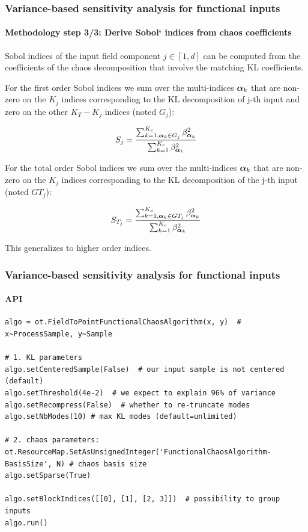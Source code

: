 \documentclass[aspectratio=169]{beamer}
\begin{document}
\begin{frame}
\frametitle{Variance-based sensitivity analysis for functional inputs}

\framesubtitle{Methodology step 3/3: Derive Sobol` indices from chaos coefficients}

Sobol indices of the input field component $j \in [1,d]$ can be computed
from the coefficients of the chaos decomposition that involve the
matching KL coefficients.

For the first order Sobol indices we sum over the multi-indices ${\mathbf{\boldsymbol{{\alpha}}}}_k$
that are non-zero on the $K_j$ indices corresponding to the KL
decomposition of j-th input and zero on the other $K_T - K_j$ indices (noted $G_j$):

$$
S_j = \frac{\sum_{k=1, {\mathbf{\boldsymbol{{\alpha}}}}_k \in G_j}^{K_c} \beta_{{\mathbf{\boldsymbol{{\alpha}}}}_k}^2}{\sum_{k=1}^{K_c} \beta_{{\mathbf{\boldsymbol{{\alpha}}}}_k}^2}
$$

For the total order Sobol indices we sum over the multi-indices ${\mathbf{\boldsymbol{{\alpha}}}}_k$
that are non-zero on the $K_j$ indices corresponding to the KL
decomposition of the j-th input (noted $GT_j$):

$$
S_{T_j} = \frac{\sum_{k=1, {\mathbf{\boldsymbol{{\alpha}}}}_k \in GT_j}^{K_c} \beta_{{\mathbf{\boldsymbol{{\alpha}}}}_k}^2}{\sum_{k=1}^{K_c} \beta_{{\mathbf{\boldsymbol{{\alpha}}}}_k}^2} 
$$

This generalizes to higher order indices.

\end{frame}


\begin{frame}[containsverbatim]
\frametitle{Variance-based sensitivity analysis for functional inputs}

\framesubtitle{API}

\lstset{language=python}
\begin{lstlisting}
algo = ot.FieldToPointFunctionalChaosAlgorithm(x, y)  # x~ProcessSample, y~Sample

# 1. KL parameters
algo.setCenteredSample(False)  # our input sample is not centered (default)
algo.setThreshold(4e-2)  # we expect to explain 96% of variance
algo.setRecompress(False)  # whether to re-truncate modes
algo.setNbModes(10) # max KL modes (default=unlimited)

# 2. chaos parameters:
ot.ResourceMap.SetAsUnsignedInteger('FunctionalChaosAlgorithm-BasisSize', N) # chaos basis size
algo.setSparse(True)

algo.setBlockIndices([[0], [1], [2, 3]])  # possibility to group inputs
algo.run()
\end{lstlisting}

\end{frame}
\end{document}
